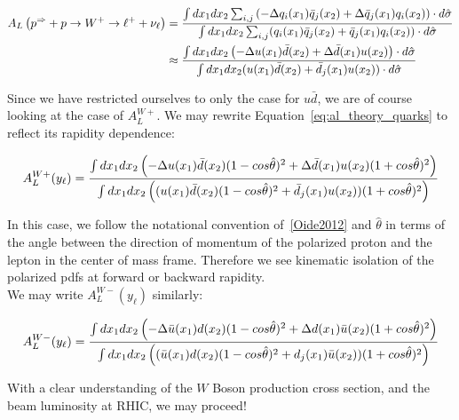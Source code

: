 \begin{align}\label{eq:al_theory_quarks}
  {
    A_L
    \left(
      p^{\Rightarrow}+p\rightarrow W^+ \rightarrow \ell^+ +\nu_{\ell}
    \right)
  } &=  
  {
    {
      \int dx_1 dx_2 \sum_{i,j}
      \left(
        -\Delta q_i(x_1)\bar{q}_j(x_2)
        +\Delta \bar{q}_j(x_1)q_i(x_2)
      \right)\cdot d \hat{\sigma}
    }
    \over
    {
      \int dx_1 dx_2
      \sum_{i,j}(q_i(x_1)\bar{q}_j(x_2)+\bar{q}_j(x_1)q_i(x_2))\cdot d\hat{\sigma}
    }
 }\\
 & \approx  \nonumber
 {
   {
      \int dx_1 dx_2 
      \left(
        -\Delta u(x_1)\bar{d}(x_2)
        +\Delta \bar{d}(x_1)u(x_2)
      \right)\cdot d \hat{\sigma}
   }
   \over
   {
      \int dx_1 dx_2 (u(x_1)\bar{d}(x_2)+\bar{d}_j(x_1)u(x_2))\cdot d\hat{\sigma}
   }
 }
\end{align}

Since we have restricted ourselves to only the case for $u\bar{d}$, we are of
course looking at the case of $A_L^{W+}$. We may rewrite
Equation~\ref{eq:al_theory_quarks} to reflect its rapidity dependence:

\begin{equation}
  {A_L^{W+}(y_{\ell})} = 
  {
    {
     \int dx_1 dx_2 
     \left(
       -\Delta u(x_1)\bar{d}(x_2)(1-cos\hat{\theta})^2
       +\Delta \bar{d}(x_1)u(x_2)(1+cos\hat{\theta})^2
     \right)
    }
    \over
    {
       \int dx_1 dx_2 
       \left(
       (u(x_1)\bar{d}(x_2)   (1-cos\hat{\theta})^2
      +\bar{d}_j(x_1)u(x_2)) (1+cos\hat{\theta})^2
        \right)
    }
  }
  \label{eq:al_w_pos_rapidity_dependance}
\end{equation}

In this case, we follow the notational convention of~\ref{Oide2012} and 
$\hat{\theta}$ in terms of the angle between the direction of momentum of the
polarized proton and the lepton in the center of mass frame. Therefore we see
kinematic isolation of the polarized pdfs at forward or backward rapidity.\\

{\noindent}We may write $A_L^{W-}(y_{\ell})$ similarly:

\begin{equation}
  {A_L^{W-}(y_{\ell})} = 
  {
    {
     \int dx_1 dx_2 
     \left(
       -\Delta \bar{u}(x_1)d(x_2)(1-cos\hat{\theta})^2
       +\Delta d(x_1)\bar{u}(x_2)(1+cos\hat{\theta})^2
     \right)
    }
    \over
    {
       \int dx_1 dx_2 
       \left(
         (\bar{u}(x_1)d(x_2)   (1-cos\hat{\theta})^2
         +d_j(x_1)\bar{u}(x_2)) (1+cos\hat{\theta})^2
        \right)
    }
  }
  \label{eq:al_w_neg_rapidity_dependance}
\end{equation}
\clearpage

With a clear understanding of the $W$ Boson production cross section, and the beam
luminosity at RHIC, we may proceed!

